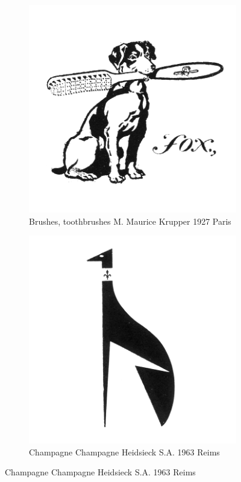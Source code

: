 \begin{figure}[h]
  \centering
  \begin{subfigure}{.45\textwidth}
    \centering
    \includegraphics[width=.5\linewidth]{images/supplement/trademarks/french/10_131}
    \caption[]{Brushes, toothbrushes M. Maurice Krupper 1927 Paris}
    \label{fig:trademarks:french:10.131}
  \end{subfigure}\hfill
  \begin{subfigure}{.45\textwidth}
    \centering
    \includegraphics[width=.5\linewidth]{images/supplement/trademarks/french/10_138}
    \caption[]{Champagne Champagne Heidsieck S.A. 1963 Reims}
    \label{fig:trademarks:french:10.138}
  \end{subfigure}


\end{figure}
